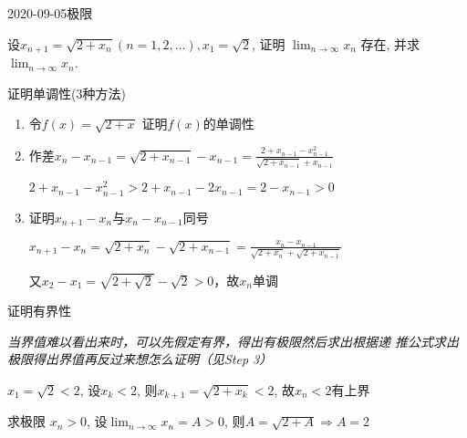 \documentclass{ctexart}
\begin{document}
\begin{mathques}{2020-09-05}{极限}
\begin{ques}
  设$x_{n + 1} = \sqrt{2 + x_n} (n = 1, 2, \dotsc), x_1 = \sqrt{2}$, 证明
  $\lim_{n \to \infty} x_n$ 存在, 并求$\lim_{n \to \infty} x_n$.
\end{ques}
\begin{solu}
  \begin{step}{证明单调性(3种方法)}
    \begin{enumerate}
      \item 令$f(x) = \sqrt{2 + x}$ 证明$f(x)$的单调性
      \item 作差$x_{n} - x_{n - 1} = \sqrt{2 + x_{n - 1}} - x_{n - 1} = \frac{2
        + x_{n - 1} - x_{n - 1}^2}{\sqrt{2 + x_{n - 1}} + x_{n - 1}}$\par
        $2 + x_{n - 1} - x_{n - 1}^2 > 2 + x_{n - 1} - 2x_{n - 1} = 2 - x_{n
        - 1} > 0$\par
      \item 证明$x_{n + 1} - x_n$与$x_{n} - x_{n - 1}$同号\par
        $x_{n + 1} - x_n = \sqrt{2 + x_n} - \sqrt{2 + x_{n - 1}} = \frac{x_n
        - x_{n - 1}}{\sqrt{2 + x_n} + \sqrt{2 + x_{n - 1}}}$\par
        又$x_2 - x_1 = \sqrt{2 + \sqrt{2}} - \sqrt{2} > 0$，故$x_n$单调
    \end{enumerate}
  \end{step}
  \begin{step}{证明有界性}
    \begin{mathideabox}
      \itshape 当界值难以看出来时，可以先假定有界，得出有极限然后求出根据递
      推公式求出极限得出界值再反过来想怎么证明（见Step 3）
    \end{mathideabox}
    $x_1 = \sqrt{2} < 2$, 设$x_k < 2$, 则$x_{k + 1} = \sqrt{2 + x_k} < 2$,
    故$x_n < 2$有上界
  \end{step}
  \begin{step}{求极限}
    $x_n > 0$, 设$\lim_{n \to \infty} x_n = A > 0$, 则$A = \sqrt{2 + A} \Rightarrow A = 2$
  \end{step}
\end{solu}
\end{mathques}
\end{document}
